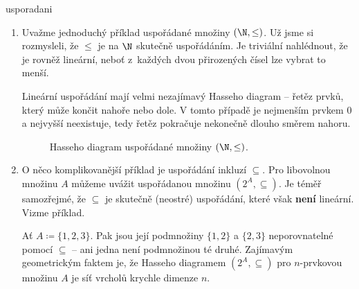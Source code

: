 \begin{example}{}{usporadani}
 \begin{enumerate}
  \item Uvažme jednoduchý příklad uspořádané množiny $(\N, \leq )$. Už jsme si
   rozmysleli, že $ \leq $ je na $\N$ skutečně uspořádáním. Je triviální
   nahlédnout, že je rovněž lineární, neboť z~každých dvou přirozených čísel lze
   vybrat to menší.
  
   Lineární uspořádání mají velmi nezajímavý Hasseho diagram -- řetěz prvků,
   který může končit nahoře nebo dole. V tomto případě je nejmenším prvkem $0$ a
   nejvyšší neexistuje, tedy řetěz pokračuje nekonečně dlouho směrem nahoru.
   \begin{figure}[H]
    \centering

    \caption{Hasseho diagram uspořádané množiny $(\N, \leq )$.}
    \label{fig:hasseho-diagram-N}
   \end{figure}
  \item O něco komplikovanější příklad je uspořádání inkluzí $ \subseteq $. Pro
   libovolnou množinu $A$ můžeme uvážit uspořádanou množinu $(2^{A}, \subseteq
   )$. Je téměř samozřejmé, že $ \subseteq $ je skutečně (neostré) uspořádání,
   které však \textbf{není} lineární. Vizme příklad.
  
   Ať $A \coloneqq \{1,2,3\}$. Pak jsou její podmnožiny $\{1,2\}$ a $\{2,3\}$
   neporovnatelné pomocí $ \subseteq $ -- ani jedna není podmnožinou té druhé.
   Zajímavým geometrickým faktem je, že Hasseho diagramem $(2^{A}, \subseteq )$
   pro $n$-prvkovou množinu $A$ je síť vrcholů krychle dimenze $n$.
   \begin{figure}[H]
    \centering
\end{figure}
\end{enumerate}
\end{example}

